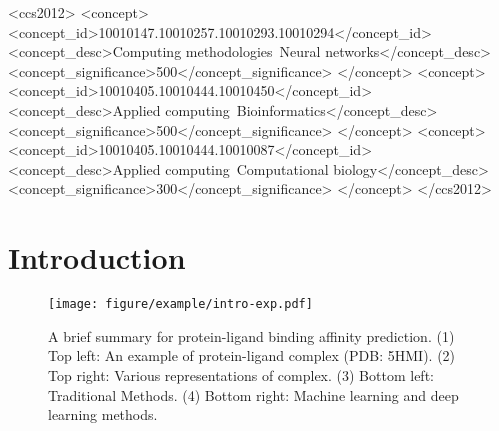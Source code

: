 \documentclass[sigconf]{acmart}
\begin{document}
%
 




\begin{CCSXML}
<ccs2012>
<concept>
<concept_id>10010147.10010257.10010293.10010294</concept_id>
<concept_desc>Computing methodologies~Neural networks</concept_desc>
<concept_significance>500</concept_significance>
</concept>
<concept>
<concept_id>10010405.10010444.10010450</concept_id>
<concept_desc>Applied computing~Bioinformatics</concept_desc>
<concept_significance>500</concept_significance>
</concept>
<concept>
<concept_id>10010405.10010444.10010087</concept_id>
<concept_desc>Applied computing~Computational biology</concept_desc>
<concept_significance>300</concept_significance>
</concept>
</ccs2012>
\end{CCSXML}



\maketitle

\section{Introduction} \label{sec-introduction}

\begin{figure}[t]
\centering
\texttt{[image: figure/example/intro-exp.pdf]}
\vspace{-4mm}
\caption{A brief summary for protein-ligand binding affinity prediction. (1) Top left: An example of protein-ligand complex (PDB: 5HMI). (2) Top right: Various representations of complex. (3) Bottom left: Traditional Methods. (4) Bottom right: Machine learning and deep learning methods.}
\label{fig-intro}
\vspace{-5mm}
\end{figure}
\end{document}
